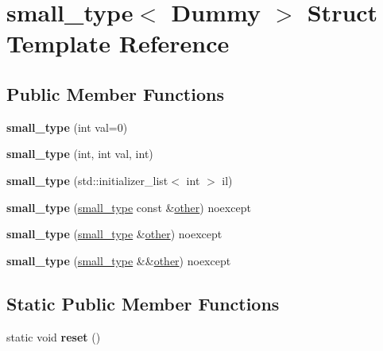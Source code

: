\hypertarget{structsmall__type}{}\section{small\+\_\+type$<$ Dummy $>$ Struct Template Reference}
\label{structsmall__type}
\subsection*{Public Member Functions}
\begin{DoxyCompactItemize}
\item 
\mbox{\label{structsmall__type_a352d135ce0ef82c0b3e76997b7297946}} 
{\bfseries small\+\_\+type} (int val=0)
\item 
\mbox{\label{structsmall__type_a1673aea827b2ec12c46420c77825dc30}} 
{\bfseries small\+\_\+type} (int, int val, int)
\item 
\mbox{\label{structsmall__type_a8f97fcc4f0c16cb7a30221eb315d6200}} 
{\bfseries small\+\_\+type} (std\+::initializer\+\_\+list$<$ int $>$ il)
\item 
\mbox{\label{structsmall__type_a57fb6794bd5bdb0e8fb3bdb2b4d966c8}} 
{\bfseries small\+\_\+type} (\mbox{\hyperlink{structsmall__type}{small\+\_\+type}} const \&\mbox{\hyperlink{structother}{other}}) noexcept
\item 
\mbox{\label{structsmall__type_aad9a9e88a753d2eab14138c9eb1a97a1}} 
{\bfseries small\+\_\+type} (\mbox{\hyperlink{structsmall__type}{small\+\_\+type}} \&\mbox{\hyperlink{structother}{other}}) noexcept
\item 
\mbox{\label{structsmall__type_ae2bef74ed5096d9752d026af1effc45c}} 
{\bfseries small\+\_\+type} (\mbox{\hyperlink{structsmall__type}{small\+\_\+type}} \&\&\mbox{\hyperlink{structother}{other}}) noexcept
\end{DoxyCompactItemize}
\subsection*{Static Public Member Functions}
\begin{DoxyCompactItemize}
\item 
\mbox{\label{structsmall__type_ae27b835164251372e6c471fee6e0170f}} 
static void {\bfseries reset} ()
\end{DoxyCompactItemize}

